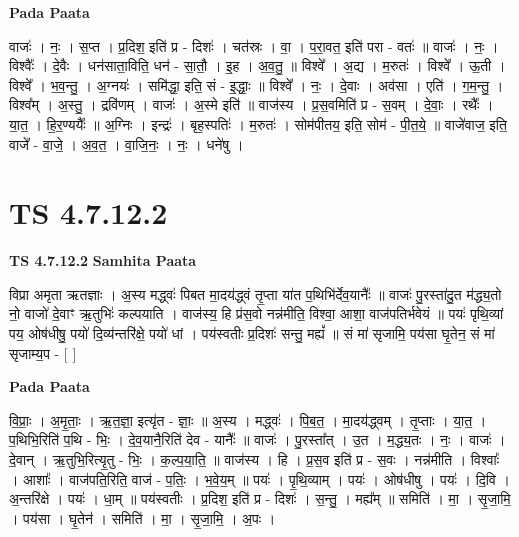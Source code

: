 \documentclass[17pt]{extarticle}
\begin{document}
\textbf{Pada Paata} \newline

वाजः॑ । नः॒ । स॒प्त । प्र॒दिश॒ इति॑ प्र - दिशः॑ । चत॑स्रः । वा॒ । प॒रा॒वत॒ इति॑ परा - वतः॑ ॥ वाजः॑ । नः॒ । विश्वैः᳚ । दे॒वैः । धन॑साता॒विति॒ धन॑ - सा॒तौ॒ । इ॒ह । अ॒व॒तु॒ ॥ विश्वे᳚ । अ॒द्य । म॒रुतः॑ । विश्वे᳚ । ऊ॒ती । विश्वे᳚ । भ॒व॒न्तु॒ । अ॒ग्नयः॑ । समि॑द्धा॒ इति॒ सं - इ॒द्धाः॒ ॥ विश्वे᳚ । नः॒ । दे॒वाः । अव॑सा । एति॑ । ग॒म॒न्तु॒ । विश्व᳚म् । अ॒स्तु॒ । द्रवि॑णम् । वाजः॑ । अ॒स्मे इति॑ ॥ वाज॑स्य । प्र॒स॒वमिति॑ प्र - स॒वम् । दे॒वाः॒ । रथैः᳚ । या॒त॒ । हि॒र॒ण्ययैः᳚ ॥ अ॒ग्निः । इन्द्रः॑ । बृह॒स्पतिः॑ । म॒रुतः॑ । सोम॑पीतय॒ इति॒ सोम॑ - पी॒त॒ये॒ ॥ वाजे॑वाज॒ इति॒ वाजे᳚ - वा॒जे॒ । अ॒व॒त॒ । वा॒जि॒नः॒ । नः॒ । धने॑षु ।  \newline





\section{ TS 4.7.12.2 }

\textbf{TS 4.7.12.2 } \newline
\textbf{Samhita Paata} \newline

विप्रा अमृता ऋतज्ञाः । अ॒स्य मद्ध्वः॑ पिबत मा॒दय॑द्ध्वं तृ॒प्ता या॑त प॒थिभि॑र्देव॒यानैः᳚ ॥ वाजः॑ पु॒रस्ता॑दु॒त म॑द्ध्य॒तो नो॒ वाजो॑ दे॒वाꣳ ऋ॒तुभिः॑ कल्पयाति । वाज॑स्य॒ हि प्र॑स॒वो नन्न॑मीति॒ विश्वा॒ आशा॒ वाज॑पतिर्भवेयं ॥ पयः॑ पृथि॒व्यां पय॒ ओष॑धीषु॒ पयो॑ दि॒व्य॑न्तरि॑क्षे॒ पयो॑ धां । पय॑स्वतीः प्र॒दिशः॑ सन्तु॒ मह्यं᳚ ॥ सं मा॑ सृजामि॒ पय॑सा घृ॒तेन॒ सं मा॑ सृजाम्य॒प - [  ] \newline

\textbf{Pada Paata} \newline

वि॒प्राः॒ । अ॒मृ॒ताः॒ । ऋ॒त॒ज्ञा॒ इत्यृ॑त - ज्ञाः॒ ॥ अ॒स्य । मद्ध्वः॑ । पि॒ब॒त॒ । मा॒दय॑द्ध्वम् । तृ॒प्ताः । या॒त॒ । प॒थिभि॒रिति॑ प॒थि - भिः॒ । दे॒व॒यानै॒रिति॑ देव - यानैः᳚ ॥ वाजः॑ । पु॒रस्ता᳚त् । उ॒त । म॒द्ध्य॒तः । नः॒ । वाजः॑ । दे॒वान् । ऋ॒तुभि॒रित्यृ॒तु - भिः॒ । क॒ल्प॒या॒ति॒ ॥ वाज॑स्य । हि । प्र॒स॒व इति॑ प्र - स॒वः । नन्न॑मीति । विश्वाः᳚ । आशाः᳚ । वाज॑पति॒रिति॒ वाज॑ - प॒तिः॒ । भ॒वे॒य॒म् ॥ पयः॑ । पृ॒थि॒व्याम् । पयः॑ । ओष॑धीषु । पयः॑ । दि॒वि । अ॒न्तरि॑क्षे । पयः॑ । धा॒म् ॥ पय॑स्वतीः । प्र॒दिश॒ इति॑ प्र - दिशः॑ । स॒न्तु॒ । मह्य᳚म् ॥ समिति॑ । मा॒ । सृ॒जा॒मि॒ । पय॑सा । घृ॒तेन॑ । समिति॑ । मा॒ । सृ॒जा॒मि॒ । अ॒पः ।  \newline
\end{document}
